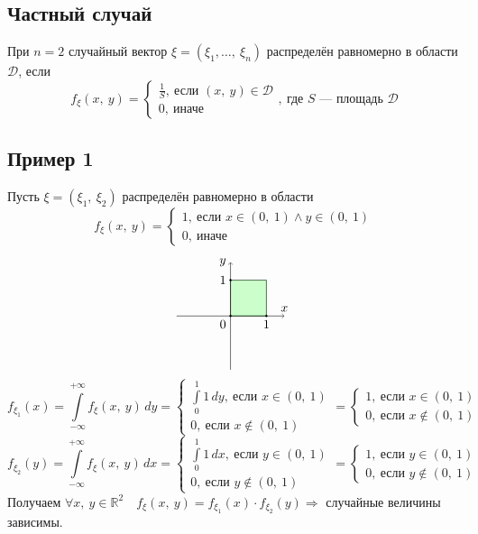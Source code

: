 \documentclass[12pt, a4paper]{article}
\begin{document}
    \subsection*{Частный случай}
    При $n = 2$ случайный вектор $\xi = (\xi_1,\dots,\ \xi_n)$ распределён равномерно в области $\mathcal{D}$, если 
    \[f_{\xi}(x,\ y) = \begin{cases}
        \frac{1}{S},\ \text{если } (x,\ y)\in \mathcal{D}\\
        0,\ \text{иначе}
    \end{cases},\ \text{где $S$ --- площадь $\mathcal{D}$}\]
    \subsection*{Пример 1}
    Пусть $\xi = (\xi_1,\ \xi_2)$ распределён равномерно в области
    \[f_{\xi}(x,\ y) = \begin{cases}
        1,\ \text{если } x\in (0,\ 1)\wedge y\in(0,\ 1)\\
        0,\ \text{иначе}
    \end{cases}\]
    \[\begin{tikzpicture}
        \draw[->] (0, -1.5) -- (0, 1.5) node[anchor=east]{$y$};
        \draw[->] (-1.5, 0) -- (1.5, 0) node[anchor=south]{$x$};
        \filldraw[green, opacity=0.2] (0, 0) rectangle (1, 1);
        \draw (0, 0) rectangle (1, 1);
        \filldraw (1, 0) circle (0.25mm) node[anchor=north]{1};
        \filldraw (0, 1) circle (0.25mm) node[anchor=east]{1};
        \filldraw (0, 0) circle (0.25mm) node[anchor=north east]{0};
    \end{tikzpicture}\]
    \[f_{\xi_1}(x) = \int\limits_{-\infty}^{+\infty} f_{\xi}(x,\ y)\, dy = \begin{cases}
        \displaystyle\int\limits_0^1 1\, dy,\ \text{если } x\in (0,\ 1)\\
        0,\ \text{если } x\notin(0,\ 1)
    \end{cases} = \begin{cases}
        1,\ \text{если } x\in (0,\ 1)\\
        0,\ \text{если } x\notin(0,\ 1)
    \end{cases} \]
    \[f_{\xi_2}(y) = \int\limits_{-\infty}^{+\infty} f_{\xi}(x,\ y)\, dx = \begin{cases}
        \displaystyle\int\limits_0^1 1\, dx,\ \text{если } y\in (0,\ 1)\\
        0,\ \text{если } y\notin(0,\ 1)
    \end{cases} = \begin{cases}
        1,\ \text{если } y\in (0,\ 1)\\
        0,\ \text{если } y\notin(0,\ 1)
    \end{cases} \]
    Получаем $\forall x,\ y\in \mathbb{R}^2\quad f_{\xi}(x,\ y) = f_{\xi_1}(x)\cdot f_{\xi_2}(y)\Rightarrow$ случайные величины зависимы.
\end{document}
